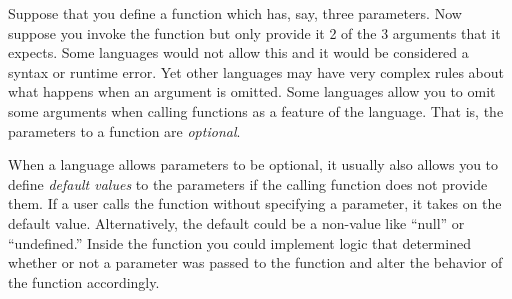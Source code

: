 Suppose that you define a function which has, say, three 
parameters.  Now suppose you invoke the function but only
provide it 2 of the 3 arguments that it expects.  Some languages
would not allow this and it would be considered a syntax or
runtime error.  Yet other languages may have very complex 
rules about what happens when an argument is omitted.  Some
languages allow you to omit some arguments when calling functions
as a feature of the language.  That is, the parameters to a function
are \emph{optional}.  

When a language allows parameters to be optional, it usually also
allows you to define \emph{default values} to the parameters if
the calling function does not provide them.   If a user calls the
function without specifying a parameter, it takes on the default
value.  Alternatively, the default could be a non-value like ``null''
or ``undefined.''  Inside the function you could implement logic that 
determined whether or not a parameter was passed to the function
and alter the behavior of the function accordingly.  

